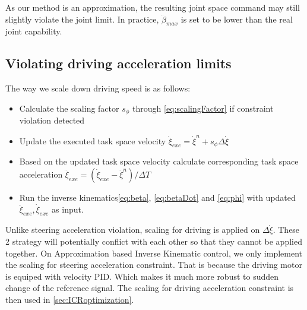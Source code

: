 As our method is an approximation, the resulting joint space command may still slightly violate the joint limit. In practice, $\ddot{\beta}_{max}$ is set to be lower than the real joint capability.
\subsection{Violating driving acceleration limits}
The way we scale down driving speed is as follows:
\begin{itemize}
    \item Calculate the scaling factor $s_{\phi}$ through \cref{eq:scalingFactor} if constraint violation detected
    \item Update the executed task space velocity $\dot{\xi}_{exe}=\dot{\xi}^n+s_{\phi}\Delta\dot{\xi}$
    \item Based on the updated task space velocity calculate corresponding task space acceleration $\ddot{\xi}_{exe}=(\dot{\xi}_{exe}-\ddot{\xi}^n)/\Delta T$
    \item Run the inverse kinematics\cref{eq:beta}, \cref{eq:betaDot} and \cref{eq:phi} with updated $\ddot{\xi}_{exe}, \dot{\xi}_{exe}$ as input.
\end{itemize}


Unlike steering acceleration violation, scaling for driving is applied on $\Delta\dot{\xi}$. These 2 strategy will potentially conflict with each other so that they cannot be applied together.
On Approximation based Inverse Kinematic control, we only implement the scaling for steering acceleration constraint. That is because the driving motor is equiped with velocity PID. Which makes it much more robust to sudden change of the reference signal. The scaling for driving acceleration constraint is then used in \cref{sec:ICRoptimization}.